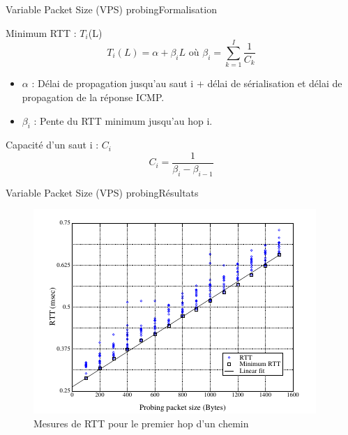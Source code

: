 \documentclass[compress]{beamer}
\begin{document}
\begin{frame}{Variable Packet Size (VPS) probing}{Formalisation}
	\begin{block}{Minimum RTT : $T_i$(L)}
	$$T_{i}(L) = \alpha + \beta_{i}L \text{ où } \beta_i = \sum^{I}_{k=1} \frac{1}{C_k}$$
	\end{block}
\begin{itemize}
	\item $\alpha$ : Délai de propagation jusqu'au saut i + délai de 	sérialisation et délai de propagation de la réponse ICMP.
	\item $\beta_i$ : Pente du RTT minimum jusqu'au hop i.
\end{itemize}
\pause
\begin{block}{Capacité d'un saut i : $C_i$}
	$$ C_i = \frac{1}{\beta_i - \beta_{i-1}} $$
\end{block}
\end{frame}


\begin{frame}{Variable Packet Size (VPS) probing}{Résultats}
	\begin{figure}[hbtp]
		\centering
		\includegraphics[scale=0.7]{schema4.png}
		\caption{Mesures de RTT pour le premier hop d'un chemin}
	\end{figure}
\end{frame}
\end{document}
